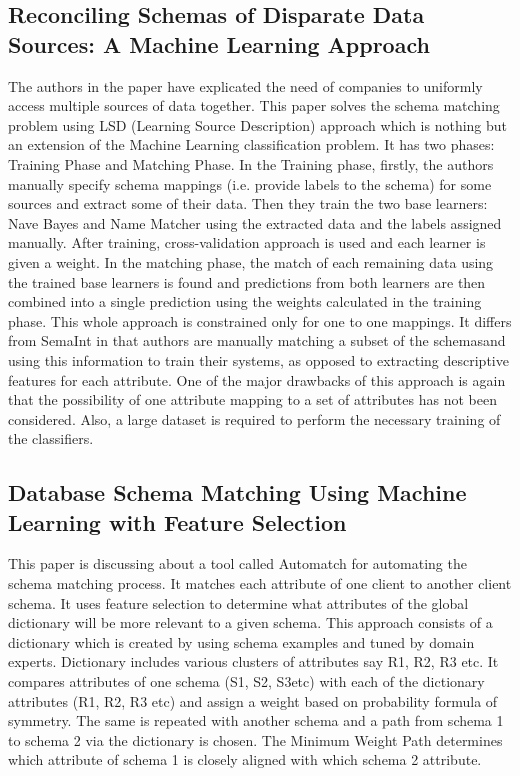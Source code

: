 \documentclass[conference]{IEEEtran}
\begin{document}
\subsection{\textbf{Reconciling Schemas of Disparate Data Sources: A Machine Learning Approach}\cite{ref2}}
The authors in the paper have explicated the need of companies to uniformly access multiple sources of data together. This paper solves the schema matching problem using
LSD (Learning Source Description) approach which is nothing but an extension of the Machine Learning
classification problem. It has two phases: Training Phase and Matching Phase. In the Training phase,
firstly, the authors manually specify schema mappings (i.e. provide labels to the schema) for some sources
and extract some of their data. Then they train the two base learners: Nave Bayes and Name Matcher
using the extracted data and the labels assigned manually. After training, cross-validation approach is
used and each learner is given a weight. In the matching phase, the match of each remaining data using
the trained base learners is found and predictions from both learners are then combined into a single
prediction using the weights calculated in the training phase. This whole approach is constrained only
for one to one mappings. It differs from SemaInt in that authors are manually matching a subset of the
schemasand using this information to train their systems, as opposed to extracting descriptive features
for each attribute.
One of the major drawbacks of this approach is again that the possibility of one attribute mapping
to a set of attributes has not been considered. Also, a large dataset is required to perform the necessary
training of the classifiers.
\subsection{\textbf{Database Schema Matching Using Machine Learning with Feature Selection}\cite{ref3}}
This paper is discussing about a tool called Automatch for automating the schema matching process. It
matches each attribute of one client to another client schema. It uses feature selection to determine what
attributes of the global dictionary will be more relevant to a given schema. This approach consists of a
dictionary which is created by using schema examples and tuned by domain experts. Dictionary includes
various clusters of attributes say R1, R2, R3 etc. It compares attributes of one schema (S1, S2, S3etc)
with each of the dictionary attributes (R1, R2, R3 etc) and assign a weight based on probability formula
of symmetry. The same is repeated with another schema and a path from schema 1 to schema 2 via
the dictionary is chosen. The Minimum Weight Path determines which attribute of schema 1 is closely
aligned with which schema 2 attribute.
\end{document}
